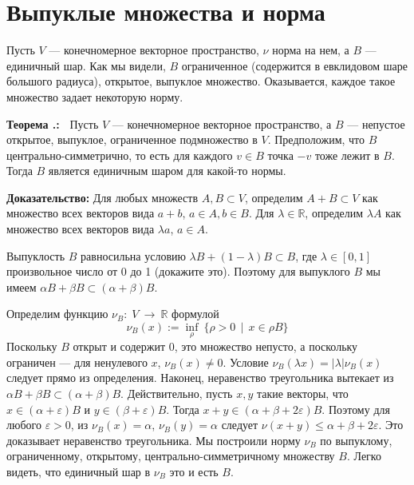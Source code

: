 \documentclass[12pt]{book}
\newcommand{\arrow}{{\:\longrightarrow\:}}
\def\endproof{\hbox{\vrule width 5pt height 5pt depth 0pt}}
\renewcommand{\epsilon}{\varepsilon}
\def\R{{\mathbb R}}
\theoremstyle{upshape}
\theoremstyle{generic}
\theoremstyle{upshapenonumber}
\newcommand{\следствие}{%
     \refstepcounter{teorema}
     {\noindent\bf Следствие \thechapter.\arabic{teorema}:\ }}
\newcommand{\пример}{%
     \refstepcounter{teorema}
     {\noindent\bf Пример \thechapter.\arabic{teorema}:\ }}
\newcommand{\лемма}{%
     \refstepcounter{teorema}
     {\noindent\bf Лемма \thechapter.\arabic{teorema}:\ }}
\newcommand{\теорема}{%
     \refstepcounter{teorema}
     {\noindent\bf Теорема \thechapter.\arabic{teorema}:\ }}
\newcommand{\утверждение}{%
     \refstepcounter{teorema}
     {\noindent\bf Утверждение \thechapter.\arabic{teorema}:\ }}
\def\хфилл{\hfill}
\def\бф{\bf}
\begin{document}

\section{Выпуклые множества и норма}


Пусть $V$ --- конечномерное векторное пространство,
$\nu$ норма на нем, а $B$ --- единичный шар.
Как мы видели, $B$ ограниченное (содержится
в евклидовом шаре большого радиуса), открытое,
выпуклое множество. Оказывается, каждое такое
множество задает некоторую норму.

\теорема
Пусть $V$ --- конечномерное векторное пространство,
а $B$ --- непустое открытое, выпуклое, ограниченное
подмножество в $V$. Предположим, что $B$
центрально-симметрично, то есть для каждого $v\in B$
точка $-v$ тоже лежит в $B$. Тогда $B$ является
единичным шаром для какой-то нормы.

\хфилл

{\бф Доказательство:}
Для любых множеств $A,B\subset V$, определим 
$A+B\subset V$ как множество всех векторов вида
$a+b$, $a\in A, b\in B$. Для $\lambda \in \R$,
определим $\lambda A$ как множество всех векторов
вида $\lambda a$, $a\in A$.

Выпуклость $B$ равносильна условию 
$\lambda B + (1-\lambda) B\subset B$, где $\lambda\in[0,1]$
произвольное число от 0 до 1 (докажите это).
Поэтому для выпуклого $B$ мы имеем
$\alpha B + \beta B \subset (\alpha + \beta) B$.

Определим функцию $\nu_B:\; V \arrow \R$ формулой
\[ 
  \nu_B(x) := \inf_\rho \ \{ \rho > 0\ \  | \ \ x \in \rho B\}
\]
Поскольку $B$ открыт и содержит 0, это множество непусто,
а поскольку ограничен --- для ненулевого $x$, 
$\nu_B(x)\neq 0$. Условие 
$\nu_B(\lambda x) = |\lambda| \nu_B(x)$ следует
прямо из определения. Наконец, неравенство
треугольника вытекает из 
$\alpha B + \beta B \subset (\alpha + \beta) B$.
Действительно, пусть $x, y$ такие векторы, что
$x\in (\alpha+\epsilon) B$ и $y\in (\beta+\epsilon) B$. Тогда 
$x+y \in (\alpha + \beta+2\epsilon) B$. 
Поэтому для любого $\epsilon >0$,
из $\nu_B(x) = \alpha$, 
$\nu_B(y) = \alpha$ следует
$\nu(x+y) \leq \alpha+\beta+2\epsilon$. Это 
доказывает неравенство треугольника.
Мы построили норму $\nu_B$ по выпуклому,
ограниченному, открытому, центрально-симметричному
множеству $B$. Легко видеть, что единичный
шар в $\nu_B$ это и есть $B$. \endproof
\end{document}
